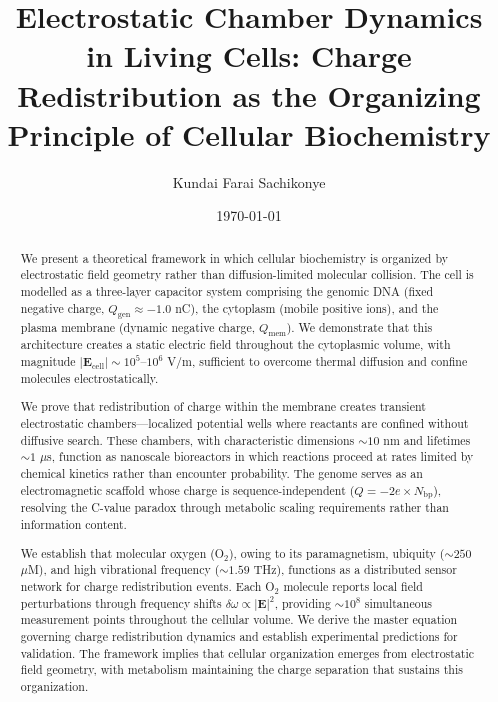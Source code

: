 \documentclass[twocolumn,10pt,aps,prd,superscriptaddress,floatfix,nofootinbib]{revtex4-2}
\theoremstyle{remark}
\newcommand{\Ecell}{\mathbf{E}_{\mathrm{cell}}}
\newcommand{\Qgen}{Q_{\mathrm{gen}}}
\newcommand{\Qmem}{Q_{\mathrm{mem}}}
\begin{document}
\title{Electrostatic Chamber Dynamics in Living Cells: Charge Redistribution as the Organizing Principle of Cellular Biochemistry}

\author{Kundai Farai Sachikonye}

\date{\today}

\begin{abstract}
We present a theoretical framework in which cellular biochemistry is organized by electrostatic field geometry rather than diffusion-limited molecular collision. The cell is modelled as a three-layer capacitor system comprising the genomic DNA (fixed negative charge, $\Qgen \approx -1.0$ nC), the cytoplasm (mobile positive ions), and the plasma membrane (dynamic negative charge, $\Qmem$). We demonstrate that this architecture creates a static electric field throughout the cytoplasmic volume, with magnitude $|\Ecell| \sim 10^{5}$--$10^{6}$ V/m, sufficient to overcome thermal diffusion and confine molecules electrostatically.

We prove that redistribution of charge within the membrane creates transient electrostatic chambers---localized potential wells where reactants are confined without diffusive search. These chambers, with characteristic dimensions $\sim 10$ nm and lifetimes $\sim 1$ $\mu$s, function as nanoscale bioreactors in which reactions proceed at rates limited by chemical kinetics rather than encounter probability. The genome serves as an electromagnetic scaffold whose charge is sequence-independent ($Q = -2e \times N_{\mathrm{bp}}$), resolving the C-value paradox through metabolic scaling requirements rather than information content.

We establish that molecular oxygen (O$_2$), owing to its paramagnetism, ubiquity ($\sim 250$ $\mu$M), and high vibrational frequency ($\sim 1.59$ THz), functions as a distributed sensor network for charge redistribution events. Each O$_2$ molecule reports local field perturbations through frequency shifts $\delta\omega \propto |\mathbf{E}|^2$, providing $\sim 10^{8}$ simultaneous measurement points throughout the cellular volume. We derive the master equation governing charge redistribution dynamics and establish experimental predictions for validation. The framework implies that cellular organization emerges from electrostatic field geometry, with metabolism maintaining the charge separation that sustains this organization.
\end{abstract}
\end{document}
